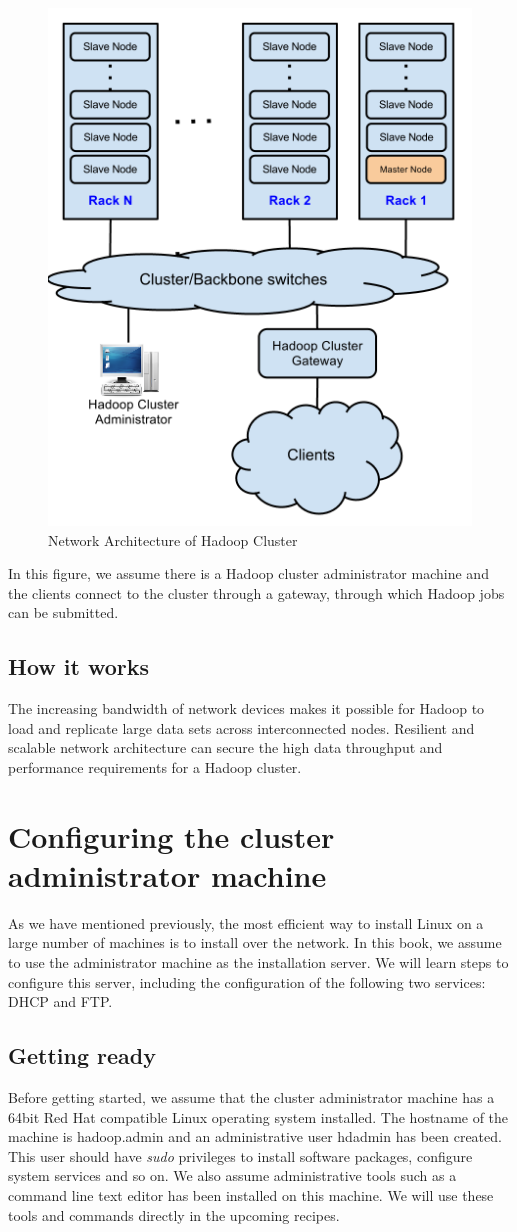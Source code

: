 \begin{figure}[h]
  \centering
  \includegraphics[width=.6\textwidth]{figs/5163OS_02_01.png}
  \caption{Network Architecture of Hadoop Cluster}\label{fig:network.architecture}
\end{figure} 

In this figure, we assume there is a Hadoop cluster administrator machine and the clients connect to the cluster through a gateway, through which Hadoop jobs can be submitted.
\subsection*{How it works}
The increasing bandwidth of network devices makes it possible for Hadoop to load and replicate large data sets across interconnected nodes. Resilient and scalable network architecture can secure the high data throughput and performance requirements for a Hadoop cluster.

\section{Configuring the cluster administrator machine}
As we have mentioned previously, the most efficient way to install Linux on a large number of machines is to install over the network. In this book, we assume to use the administrator machine as the installation server. We will learn steps to configure this server, including the configuration of the following two services: DHCP and FTP.

\subsection*{Getting ready}
Before getting started, we assume that the cluster administrator machine has a 64bit Red Hat compatible Linux operating system installed. The hostname of the machine is hadoop.admin and an administrative user hdadmin has been created. This user should have \emph{sudo} privileges to install software packages, configure system services and so on. We also assume administrative tools such as a command line text editor has been installed on this machine. We will use these tools and commands directly in the upcoming recipes.

